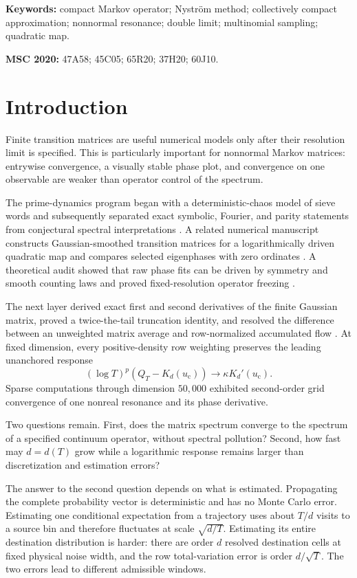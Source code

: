 \documentclass[11pt]{article}
\theoremstyle{definition}
\theoremstyle{remark}
\newcommand{\uc}{u_{\mathrm c}}
\begin{document}
\noindent\textbf{Keywords:} compact Markov operator; Nystr\"om method;
collectively compact approximation; nonnormal resonance; double limit;
multinomial sampling; quadratic map.

\medskip
\noindent\textbf{MSC 2020:} 47A58; 45C05; 65R20; 37H20; 60J10.

\section{Introduction}

Finite transition matrices are useful numerical models only after their
resolution limit is specified.  This is particularly important for
nonnormal Markov matrices: entrywise convergence, a visually stable phase
plot, and convergence on one observable are weaker than operator control of
the spectrum.

The prime-dynamics program began with a deterministic-chaos model of sieve
words \citep{Wang2026Published} and subsequently separated exact symbolic,
Fourier, and parity statements from conjectural spectral interpretations
\citep{WangParity2026}.  A related numerical manuscript constructs
Gaussian-smoothed transition matrices for a logarithmically driven quadratic
map and compares selected eigenphases with zero ordinates
\citep{WangSpectralFlow2026}.  A theoretical audit showed that raw phase fits
can be driven by symmetry and smooth counting laws and proved fixed-resolution
operator freezing \citep{WangObstructions2026}.

The next layer derived exact first and second derivatives of the finite
Gaussian matrix, proved a twice-the-tail truncation identity, and resolved the
difference between an unweighted matrix average and row-normalized accumulated
flow \citep{WangGaussianResponse2026}.  At fixed dimension, every
positive-density row weighting preserves the leading unanchored response
\[
  (\log T)^p(Q_T-K_d(\uc))\longrightarrow\kappa K_d'(\uc).
\]
Sparse computations through dimension $50{,}000$ exhibited second-order grid
convergence of one nonreal resonance and its phase derivative.

Two questions remain.  First, does the matrix spectrum converge to the
spectrum of a specified continuum operator, without spectral pollution?
Second, how fast may $d=d(T)$ grow while a logarithmic response remains larger
than discretization and estimation errors?

The answer to the second question depends on what is estimated.  Propagating
the complete probability vector is deterministic and has no Monte Carlo
error.  Estimating one conditional expectation from a trajectory uses about
$T/d$ visits to a source bin and therefore fluctuates at scale
$\sqrt{d/T}$.  Estimating its entire destination distribution is harder:
there are order $d$ resolved destination cells at fixed physical noise width,
and the row total-variation error is order $d/\sqrt T$.  The two errors lead
to different admissible windows.
\end{document}

